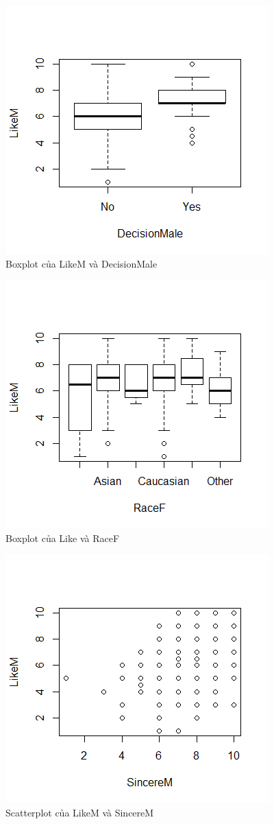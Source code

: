 \documentclass[a4paper,12pt]{article}
\begin{document}
	\begin{figure}[H]
		\includegraphics[width=0.7\linewidth]{Rplot2}
		\caption{Boxplot của LikeM và DecisionMale}
		\label{fig:rplot2}
	\end{figure}
	
	\begin{figure}[H]
		\includegraphics[width=0.7\linewidth]{Rplot3}
		\caption{Boxplot của Like và RaceF}
		\label{fig:rplot3}
	\end{figure}
	
	\begin{figure}[H]
		\includegraphics[width=0.7\linewidth]{Rplot4}
		\caption{Scatterplot của LikeM và SincereM}
		\label{fig:rplot4}
	\end{figure}	
	
\end{document}
